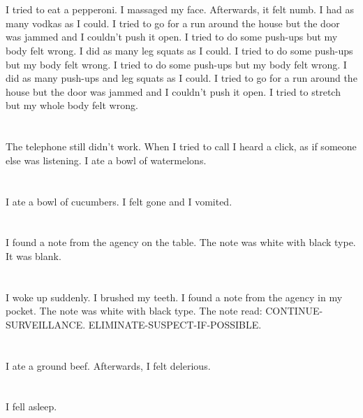 \documentclass{article}
\begin{document}
    \section{}
    I tried to eat a pepperoni. I massaged my face. Afterwards, it felt numb. I had as many vodkas as I could.  I tried to go for a run around the house but the door was jammed and I couldn't push it open.  I tried to do some push-ups but my body felt wrong.  I did as many leg squats as I could.  I tried to do some push-ups but my body felt wrong.   I tried to do some push-ups but my body felt wrong.  I did as many push-ups and leg squats as I could.  I tried to go for a run around the house but the door was jammed and I couldn't push it open.  I tried to stretch but my whole body felt wrong.  
    \newpage
    
    \section{}
    The telephone still didn't work. When I tried to call I heard a click, as if someone else was listening. I ate a bowl of watermelons.  
    \newpage
    
    \section{}
    I ate a bowl of cucumbers. I felt gone and I vomited.  
    \newpage
    
    \section{}
    I found a note from the agency on the table. The note was white with black type. It was blank.  
    \newpage
    
    \section{}
    I woke up suddenly. I brushed my teeth. I found a note from the agency in my pocket. The note was white with black type. The note read: CONTINUE-SURVEILLANCE. ELIMINATE-SUSPECT-IF-POSSIBLE.  
    \newpage
    
    \section{}
    I ate a ground beef. Afterwards, I felt delerious.  
    \newpage
    
    \section{}
    I fell asleep.\\\\ 
    \newpage
    
\end{document}
